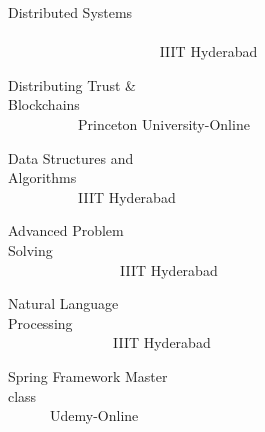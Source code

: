 



  \cventry
    {} %
    {} %
    {} %
    {} %
    {      \begin{cvitems} %
         \item {\hspace{1cm}Distributed Systems ~~~~~~~~~~~~~~~~~~~~~~~~~~~~~~~~~~~~~~~~~~~~~~~~~~~~~~~~~~~~~~~~~~~~~~~~~~~~~~~~~~~~~~~~~~~~~ IIIT Hyderabad}
        \item {\hspace{1cm}Distributing Trust \& Blockchains~~~~~~~~~~~~~~~~~~~~~~~~~~~~~~~~~~~~~~~~~~~~~~~~~~~~~~~~~~~~~~~~~~~~~~~Princeton University-Online}
        \item {\hspace{1cm}Data Structures and Algorithms~~~~~~~~~~~~~~~~~~~~~~~~~~~~~~~~~~~~~~~~~~~~~~~~~~~~~~~~~~~~~~~~~~~~~~~~IIIT Hyderabad}
        \item {\hspace{1cm}Advanced Problem Solving~~~~~~~~~~~~~~~~~~~~~~~~~~~~~~~~~~~~~~~~~~~~~~~~~~~~~~~~~~~~~~~~~~~~~~~~~~~~~~~~~IIIT Hyderabad}
        \item {\hspace{1cm}Natural Language Processing~~~~~~~~~~~~~~~~~~~~~~~~~~~~~~~~~~~~~~~~~~~~~~~~~~~~~~~~~~~~~~~~~~~~~~~~~~~~~IIIT Hyderabad}
        \item{\hspace{1cm}Spring Framework Master class~~~~~~~~~~~~~~~~~~~~~~~~~~~~~~~~~~~~~~~~~~~~~~~~~~~~~~~~~~~~~~~~~~~~~~~~~Udemy-Online}
      \end{cvitems}
    }




